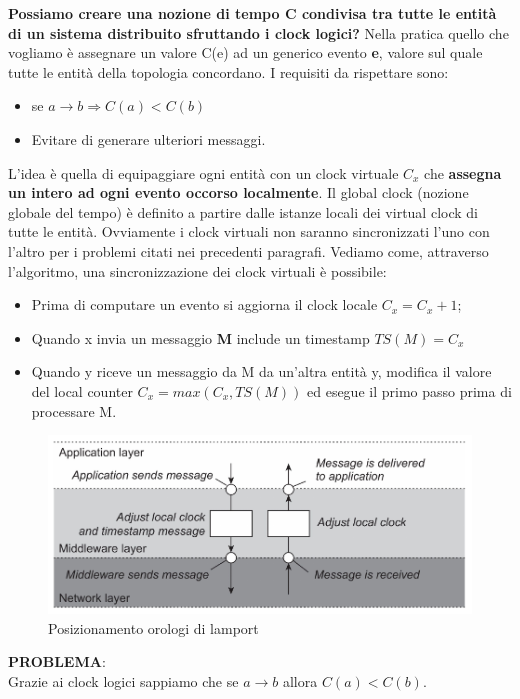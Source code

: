 \documentclass[12pt]{article}
\begin{document}
	   		\textbf{Possiamo creare una nozione di tempo \textbf{C} condivisa tra tutte le entità di un sistema distribuito sfruttando i clock logici?} Nella pratica quello che vogliamo è assegnare un valore C(e) ad un generico evento \textbf{e}, valore sul quale tutte le entità della topologia concordano. I requisiti da rispettare sono:
	    	\begin{itemize}
	    		\item se $a \rightarrow b \Rightarrow C(a)<C(b)	  $
	    		\item Evitare di generare ulteriori messaggi.
	    	\end{itemize}
    		L'idea è quella di equipaggiare ogni entità con un clock virtuale $C_x$ che \textbf{assegna un intero ad ogni evento occorso localmente}. Il global clock (nozione globale del tempo) è definito a partire dalle istanze locali dei virtual clock di tutte le entità. Ovviamente i clock virtuali non saranno sincronizzati l'uno con l'altro per i problemi citati nei precedenti paragrafi. Vediamo come, attraverso l'algoritmo, una sincronizzazione dei clock virtuali è possibile:
    		\begin{itemize}
    			\item Prima di computare un evento si aggiorna il clock locale $C_x= C_x +1$;
    			\item Quando x invia un messaggio \textbf{M} include un timestamp $TS(M) = C_x$
    			\item Quando y riceve un messaggio da M da un'altra entità y, modifica il valore del local counter $C_x = max(C_x, TS(M))$ ed esegue il primo passo prima di processare M.
    		\end{itemize}
    		\begin{figure}[h!]
    			\centering
    			\includegraphics[scale=0.45]{img/lamp.png}
    			\caption{Posizionamento orologi di lamport}
    		\end{figure}
    		\textbf{PROBLEMA}:\\
    		Grazie ai clock logici sappiamo che se $a \rightarrow b $ allora $C(a)<C(b)$. \\
\end{document}
